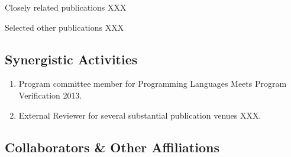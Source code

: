 
\noindent Closely related publications XXX


\noindent
\noindent Selected other publications XXX

\subsection*{Synergistic Activities}


\begin{enumerate}\itemsep 0pt
  \item Program committee member for Programming Languages Meets Program Verification 2013.
  \item External Reviewer for several substantial publication venues XXX.
\end{enumerate}


\subsection*{Collaborators \& Other Affiliations}

\noindent

